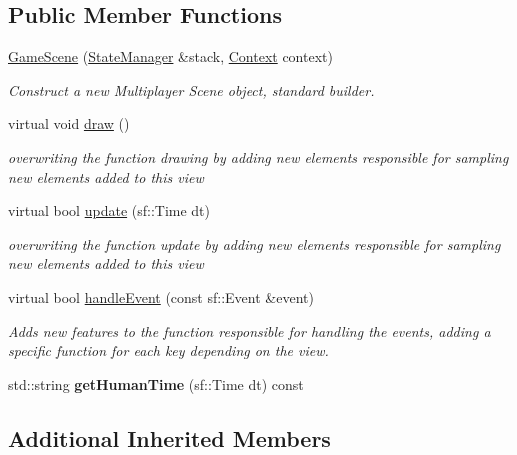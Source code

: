 \subsection*{Public Member Functions}
\begin{DoxyCompactItemize}
\item 
\hyperlink{classGameScene_abc5dab6de1f960181d01c4991c15a3e8}{Game\+Scene} (\hyperlink{classStateManager}{State\+Manager} \&stack, \hyperlink{structState_1_1Context}{Context} context)
\begin{DoxyCompactList}\small\item\em Construct a new Multiplayer Scene object, standard builder. \end{DoxyCompactList}\item 
\mbox{\label{classGameScene_ae9eb60cbb8fa55eeb07b951e3d83f426}} 
virtual void \hyperlink{classGameScene_ae9eb60cbb8fa55eeb07b951e3d83f426}{draw} ()
\begin{DoxyCompactList}\small\item\em overwriting the function drawing by adding new elements responsible for sampling new elements added to this view \end{DoxyCompactList}\item 
virtual bool \hyperlink{classGameScene_ac47e1a8082955a6c7af92cf7dbdd9347}{update} (sf\+::\+Time dt)
\begin{DoxyCompactList}\small\item\em overwriting the function update by adding new elements responsible for sampling new elements added to this view \end{DoxyCompactList}\item 
virtual bool \hyperlink{classGameScene_aa494372b1f451f3c3a268558fddb30f2}{handle\+Event} (const sf\+::\+Event \&event)
\begin{DoxyCompactList}\small\item\em Adds new features to the function responsible for handling the events, adding a specific function for each key depending on the view. \end{DoxyCompactList}\item 
\mbox{\label{classGameScene_aa3729415c97d2bcf67add017213d0f27}} 
std\+::string {\bfseries get\+Human\+Time} (sf\+::\+Time dt) const
\end{DoxyCompactItemize}
\subsection*{Additional Inherited Members}


